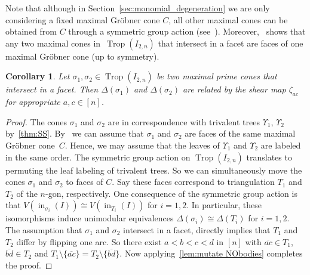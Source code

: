 \documentclass[10pt,a4paper]{amsart}
\newcommand{\thlabel}[1]{\label{#1}}
\newcommand{\thref}[1]{\ref{#1}}
\newtheorem{Corollary}[Theorem]{Corollary}
\numberwithin{equation}{section}
\DeclareMathOperator{\init}{in}
\DeclareMathOperator{\trop}{Trop}
\DeclareMathOperator{\ttrop}{\mathbb{T}rop}
\begin{document}
Note that although in Section~\ref{sec:monomial_degeneration} we are only considering a fixed maximal Gr\"obner cone $C$, all other maximal cones can be obtained from $C$ through a symmetric group action (see~\cite[Second Proof of $\supseteq$ Theorem~4.3.5]{M-S}).
Moreover,~\cite[Lemma~5.13]{EH-NObodies} shows that any two maximal cones in~$\trop(I_{2,n})$ that intersect in a facet are faces of one maximal Gr\"obner cone (up to symmetry).


\begin{Corollary}\thlabel{cor:mutate NObodies}
Let $\sigma_1,\sigma_2\in\trop(I_{2,n})$ be two maximal prime cones that intersect in a facet. Then $\Delta(\sigma_1)$ and $\Delta(\sigma_2)$ are %
related by the shear map $\zeta_{ac}$ for appropriate $a,c\in [n]$.
\end{Corollary}
\begin{proof}
The cones $\sigma_1$ and $\sigma_2$ are in correspondence with trivalent trees $\Upsilon_{1}$, $\Upsilon_{2}$ by~\thref{thm:SS}.
By~\cite[Lemma~5.13]{EH-NObodies} we can assume that $\sigma_1$ and $\sigma_2$ are faces of the same maximal Gr\"obner cone~$C$.
Hence, we may assume that the leaves of $\Upsilon_{1}$ and $\Upsilon_{2}$ are labeled in the same order.
The symmetric group action on $\trop(I_{2,n})$
translates to permuting the leaf labeling of trivalent trees.
So we can simultaneously move the cones $\sigma_1$ and $\sigma_2$ to faces of $C$.
Say these faces correspond to triangulation $T_1$ and $T_2$ of the $n$-gon, respectively.
One consequence of the symmetric group action is that $V(\init_{\sigma_i}(I))\cong V(\init_{T_i}(I))$ for $i=1,2$.
In particular, these isomorphisms induce unimodular equivalences
$\Delta(\sigma_i)\cong \Delta(T_i)$ for $i=1,2$.
The assumption that $\sigma_1$ and $\sigma_2$ intersect in a facet, directly implies that $T_1$ and $T_2$ differ by flipping one arc.
So there exist $a<b<c<d$ in $[n]$ with ${\overline{ac}}\in T_1$, $\overline{bd}\in T_2$ and $T_1\setminus \{\overline{ac}\}=T_2\setminus\{\overline{bd}\}$.
Now applying~\thref{lem:mutate NObodies} completes the proof.
\end{proof}
\end{document}
